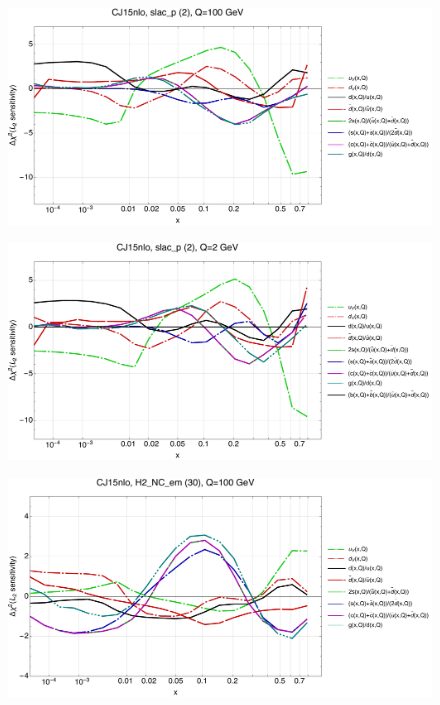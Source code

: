 \documentclass[10pt,aps,prd,floatfix,titlepage]{revtex4}
\begin{document}
\clearpage
\begin{figure}
\includegraphics[width=\textwidth,height=0.44\textheight,keepaspectratio]{2/2_CJ15nlo_q100_Sf_2.pdf}
\caption{}
\end{figure}
\begin{figure}
\includegraphics[width=\textwidth,height=0.44\textheight,keepaspectratio]{2/2_CJ15nlo_q2_Sf_2.pdf}
\caption{}
\end{figure}
\clearpage
\begin{figure}
\includegraphics[width=\textwidth,height=0.44\textheight,keepaspectratio]{2/30_CJ15nlo_q100_Sf_2.pdf}
\caption{}
\end{figure}
\end{document}
